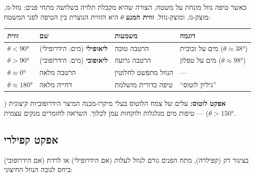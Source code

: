 \documentclass[
  hebrew,
  letterpaper,
  DIV=11,
  numbers=noendperiod]{scrreprt}
\newcounter{none} %
\begin{document}
כאשר טיפה נוזל מונחת על משטח, הצורה שהיא מקבלת תלויה בשלושה מתחי פנים:
נוזל-גז, מוצק-גז, ומוצק-נוזל. \textbf{זווית המגע} \(\theta\) היא הזווית
הנוצרת בין הטיפה לפני המשטח:

{\def\LTcaptype{none} %
\begin{longtable}[]{@{}
  >{\raggedright\arraybackslash}p{}
  >{\raggedright\arraybackslash}p{}
  >{\raggedright\arraybackslash}p{}
  >{\raggedright\arraybackslash}p{}@{}}
\toprule\noalign{}
\begin{minipage}[b]{\linewidth}\raggedright
זווית
\end{minipage} & \begin{minipage}[b]{\linewidth}\raggedright
שם
\end{minipage} & \begin{minipage}[b]{\linewidth}\raggedright
משמעות
\end{minipage} & \begin{minipage}[b]{\linewidth}\raggedright
דוגמה
\end{minipage} \\
\midrule\noalign{}
\endhead
\bottomrule\noalign{}
\endlastfoot
\(\theta < 90°\) & \textbf{ליאופילי} (מים: הידרופילי) & הרטבה טובה & מים
על זכוכית (\(\theta \approx 38°\)) \\
\(\theta > 90°\) & \textbf{ליאופובי} (מים: הידרופובי) & הרטבה גרועה &
מים על טפלון (\(\theta \approx 98°\)) \\
\(\theta \approx 0°\) & הרטבה מלאה & הנוזל מתפשט לחלוטין & --- \\
\(\theta \approx 180°\) & דחייה מלאה & טיפה כדורית מושלמת & ``גיליון
לוטוס'' \\
\end{longtable}
}

\textbf{אפקט לוטוס:} עלים של צמח הלוטוס בעלי מיקרו-מבנה המיצר
הידרופוביות קיצונית (\(\theta > 150°\)) --- טיפות מים מגלגלות ולוקחות
עמן לכלוך. השראה לחומרים מנקים עצמית.

\subsection{אפקט
קפילרי}\label{ux5d0ux5e4ux5e7ux5d8-ux5e7ux5e4ux5d9ux5dcux5e8ux5d9}

בצינור דק (קפילרה), מתח הפנים גורם לנוזל לעלות (אם הידרופילי) או לרדת
(אם הידרופובי) ביחס לגובה הנוזל החיצוני:
\end{document}
